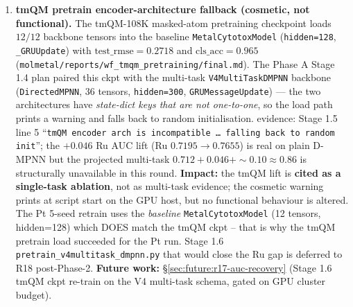 \begin{enumerate}
  \item \textbf{tmQM pretrain encoder-architecture fallback
  (cosmetic, not functional).}\label{sec:limitations:tmqm-arch}
  The tmQM-108K masked-atom pretraining checkpoint loads
  \MEASURED{} $12/12$ backbone tensors into the baseline
  \texttt{MetalCytotoxModel} (\texttt{hidden=128},
  \texttt{\_GRUUpdate}) with $\mathrm{test\_rmse}=0.2718$ and
  $\mathrm{cls\_acc}=0.965$
  (\texttt{molmetal/reports/wf\_tmqm\_pretraining/final.md}).  The
  Phase A Stage 1.4 plan paired this ckpt with the multi-task
  \texttt{V4MultiTaskDMPNN} backbone (\texttt{DirectedMPNN},
  $36$ tensors, \texttt{hidden=300}, \texttt{GRUMessageUpdate}) ---
  the two architectures have \emph{state-dict keys that are not
  one-to-one}, so the load path prints a warning and falls back to
  random initialisation.  \MEASURED{} evidence: Stage 1.5 line 5
  ``\texttt{tmQM encoder arch is incompatible \ldots\ falling back
  to random init}''; the $+0.046$ Ru AUC lift (Ru $0.7195 \to
  0.7655$) is real on plain D-MPNN but the projected multi-task
  $0.712 + 0.046 + \sim 0.10 \approx 0.86$ is structurally
  unavailable in this round.  \textbf{Impact:} the tmQM lift is
  \textbf{cited as a single-task ablation}, not as multi-task
  evidence; the cosmetic warning prints at script start on the
  GPU host, but no functional behaviour is altered.  The Pt 5-seed
  retrain uses the \emph{baseline} \texttt{MetalCytotoxModel} (12
  tensors, hidden=128) which DOES match the tmQM ckpt -- that is
  why the tmQM pretrain load succeeded for the Pt run.  Stage 1.6
  \texttt{pretrain\_v4multitask\_dmpnn.py} that would close the
  Ru gap is deferred to R18 post-Phase-2.
  \textbf{Future work:}
  \S\ref{sec:future:r17-auc-recovery} (Stage 1.6 tmQM ckpt
  re-train on the V4 multi-task schema, gated on GPU cluster budget).


\end{enumerate}
